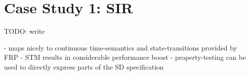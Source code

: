 \section{Case Study 1: SIR}
TODO: write 

- maps nicely to continuous time-semantics and state-transitions provided by FRP
- STM results in considerable performance boost
- property-testing can be used to directly express parts of the SD specification